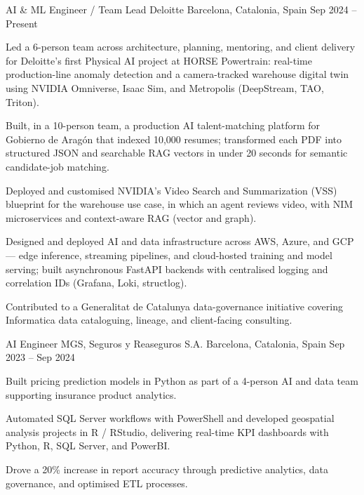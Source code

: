 

\begin{cventries}

    \cventry
    {AI \& ML Engineer / Team Lead}
    {Deloitte}
    {Barcelona, Catalonia, Spain}
    {Sep 2024 -- Present}
    {
        \begin{cvitems}
            \item {Led a 6-person team across architecture, planning, mentoring, and client delivery for Deloitte's first Physical AI project at HORSE Powertrain: real-time production-line anomaly detection and a camera-tracked warehouse digital twin using NVIDIA Omniverse, Isaac Sim, and Metropolis (DeepStream, TAO, Triton).}
            \item {Built, in a 10-person team, a production AI talent-matching platform for Gobierno de Aragón that indexed 10,000 resumes; transformed each PDF into structured JSON and searchable RAG vectors in under 20 seconds for semantic candidate-job matching.}
            \item {Deployed and customised NVIDIA's Video Search and Summarization (VSS) blueprint for the warehouse use case, in which an agent reviews video, with NIM microservices and context-aware RAG (vector and graph).}
            \item {Designed and deployed AI and data infrastructure across AWS, Azure, and GCP --- edge inference, streaming pipelines, and cloud-hosted training and model serving; built asynchronous FastAPI backends with centralised logging and correlation IDs (Grafana, Loki, structlog).}
            \item {Contributed to a Generalitat de Catalunya data-governance initiative covering Informatica data cataloguing, lineage, and client-facing consulting.}
        \end{cvitems}
    }

    \vspace{3mm}
    \cventry
    {AI Engineer}
    {MGS, Seguros y Reaseguros S.A.}
    {Barcelona, Catalonia, Spain}
    {Sep 2023 -- Sep 2024}
    {
       \begin{cvitems}
            \item {Built pricing prediction models in Python as part of a 4-person AI and data team supporting insurance product analytics.}
            \item {Automated SQL Server workflows with PowerShell and developed geospatial analysis projects in R / RStudio, delivering real-time KPI dashboards with Python, R, SQL Server, and PowerBI.}
            \item {Drove a 20\% increase in report accuracy through predictive analytics, data governance, and optimised ETL processes.}
       \end{cvitems}
    }


\end{cventries}
